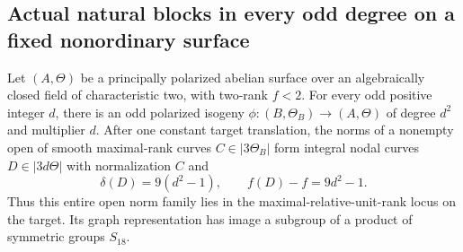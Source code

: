 \subsection{Actual natural blocks in every odd degree on a fixed nonordinary surface}

\begin{lemma}
\label{lem:nonordinary-ppav-odd-sharp-norm-candidate}
Let $(A,\Theta)$ be a principally polarized abelian surface over an
algebraically closed field of characteristic two, with two-rank $f<2$.
For every odd positive integer $d$, there is an odd polarized isogeny
$\phi:(B,\Theta_B)\to(A,\Theta)$ of degree $d^2$ and multiplier $d$.
After one constant target translation, the norms of a nonempty open
of smooth maximal-rank curves $C\in|3\Theta_B|$ form integral nodal
curves $D\in|3d\Theta|$ with normalization $C$ and
\[
             \delta(D)=9(d^2-1),\qquad
             f(D)-f=9d^2-1.
\]
Thus this entire open norm family lies in the maximal-relative-unit-rank
locus on the target. Its graph representation has image a subgroup
of a product of symmetric groups $S_{18}$.
\end{lemma}
